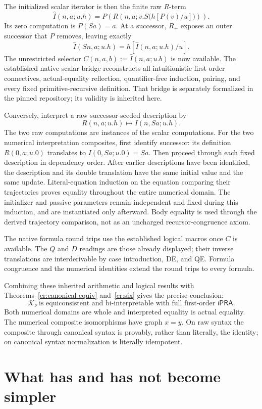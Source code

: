 \documentclass[11pt]{article}
\theoremstyle{definition}
\newcommand{\Knorm}{\mathcal K_\nu}
\newcommand{\ipra}{\mathsf{iPRA}}
\begin{document}
The initialized scalar iterator is then the finite raw \(R\)-term
\[
\widehat I(n,a;u.h)
=
P\!\left(R(n,a;v.S\bigl(h[P(v)/u]\bigr))\right).
\]
Its zero computation is \(P(Sa)=a\). At a successor, \(R_+\) exposes an outer successor that \(P\) removes, leaving exactly
\[
\widehat I(Sn,a;u.h)=h[\widehat I(n,a;u.h)/u].
\]
The unrestricted selector \(C(n,a,b):=\widehat I(n,a;u.b)\) is now available. The established native scalar bridge reconstructs all intuitionistic first-order connectives, actual-equality reflection, quantifier-free induction, pairing, and every fixed primitive-recursive definition. That bridge is separately formalized in the pinned repository; its validity is inherited here.

Conversely, interpret a raw successor-seeded description by
\[
R(n,a;u.h)\longmapsto I(n,Sa;u.h).
\]
The two raw computations are instances of the scalar computations. For the two numerical interpretation composites, first identify successor: its definition \(R(0,a;u.0)\) translates to \(I(0,Sa;u.0)=Sa\). Then proceed through each fixed description in dependency order. After earlier descriptions have been identified, the description and its double translation have the same initial value and the same update. Literal-equation induction on the equation comparing their trajectories proves equality throughout the entire numerical domain. The initializer and passive parameters remain independent and fixed during this induction, and are instantiated only afterward. Body equality is used through the derived trajectory comparison, not as an uncharged recursor-congruence axiom.

The native formula round trips use the established logical macros once \(C\) is available. The \(Q\) and \(D\) readings are those already displayed; their inverse translations are interderivable by case introduction, DE, and QE. Formula congruence and the numerical identities extend the round trips to every formula.

Combining these inherited arithmetic and logical results with Theorems~\ref{cr:canonical-equiv} and~\ref{cr:six} gives the precise conclusion:
\[
\Knorm\ \text{is equiconsistent and bi-interpretable with full first-order }\ipra.
\]
Both numerical domains are whole and interpreted equality is actual equality. The numerical composite isomorphisms have graph \(x=y\). On raw syntax the composite through canonical syntax is provably, rather than literally, the identity; on canonical syntax normalization is literally idempotent.

\section{What has and has not become simpler}
\end{document}
